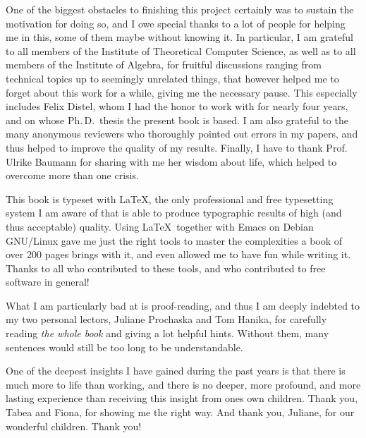 One of the biggest obstacles to finishing this project certainly was to sustain the
motivation for doing so, and I owe special thanks to a lot of people for helping me in
this, some of them maybe without knowing it.  In particular, I am grateful to all members
of the Institute of Theoretical Computer Science, as well as to all members of the
Institute of Algebra, for fruitful discussions ranging from technical topics up to
seemingly unrelated things, that however helped me to forget about this work for a while,
giving me the necessary pause.  This especially includes Felix Distel, whom I had the
honor to work with for nearly four years, and on whose Ph.\,D.\, thesis the present book
is based.  I am also grateful to the many anonymous reviewers who thoroughly pointed out
errors in my papers, and thus helped to improve the quality of my results.  Finally, I
have to thank Prof.\,Ulrike Baumann for sharing with me her wisdom about life, which
helped to overcome more than one crisis.

This book is typeset with \LaTeX, the only professional and free typesetting system I am
aware of that is able to produce typographic results of high (and thus acceptable)
quality.  Using \LaTeX\ together with Emacs on Debian GNU/Linux gave me just the right
tools to master the complexities a book of over 200 pages brings with it, and even allowed
me to have fun while writing it.  Thanks to all who contributed to these tools, and who
contributed to free software in general!

What I am particularly bad at is proof-reading, and thus I am deeply indebted to my two
personal lectors, Juliane Prochaska and Tom Hanika, for carefully reading \emph{the whole
  book} and giving a lot helpful hints.  Without them, many sentences would still be too
long to be understandable.

One of the deepest insights I have gained during the past years is that there is much more
to life than working, and there is no deeper, more profound, and more lasting experience
than receiving this insight from ones own children.  Thank you, Tabea and Fiona, for
showing me the right way.  And thank you, Juliane, for our wonderful children.  Thank you!


